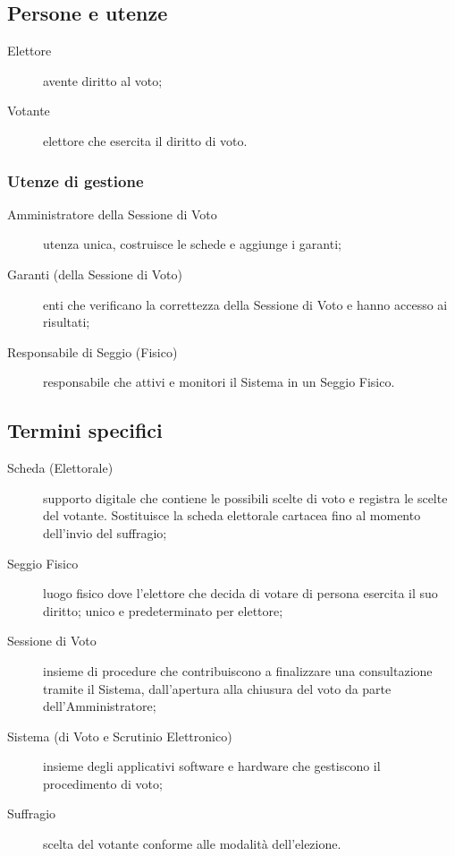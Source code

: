 \subsection{Persone e utenze}
\begin{description}
	\item[Elettore] avente diritto al voto;
	\item[Votante] elettore che esercita il diritto di voto.
\end{description}

\subsubsection{Utenze di gestione}
\begin{description}
	\item[Amministratore della Sessione di Voto] utenza unica, costruisce le schede e aggiunge i garanti;
	\item[Garanti (della Sessione di Voto)] enti che verificano la correttezza della Sessione di Voto e hanno accesso ai risultati;
	\item[Responsabile di Seggio (Fisico)] responsabile che attivi e monitori il Sistema in un Seggio Fisico.
\end{description}


\subsection{Termini specifici}
\begin{description}
	\item[Scheda (Elettorale)] supporto digitale che contiene le possibili scelte di voto e registra le scelte del votante. Sostituisce la scheda elettorale cartacea fino al momento dell'invio del suffragio;
	\item[Seggio Fisico] luogo fisico dove l'elettore che decida di votare di persona esercita il suo diritto; unico e predeterminato per elettore;
	\item[Sessione di Voto] insieme di procedure che contribuiscono a finalizzare una consultazione tramite il Sistema, dall'apertura alla chiusura del voto da parte dell'Amministratore;
	\item[Sistema (di Voto e Scrutinio Elettronico)] insieme degli applicativi software e hardware che gestiscono il procedimento di voto;
	\item[Suffragio] scelta del votante conforme alle modalità dell'elezione.
\end{description}




